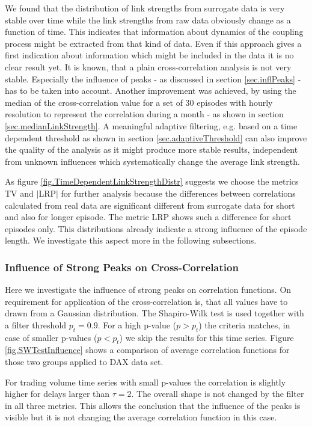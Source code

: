 \documentclass[a4paper,10pt]{scrbook}
\begin{document}
\label{ext.fig.TimeDependentLinkStrengthDistr} 


%
  
We found that the distribution of link strengths from surrogate data is very stable over time while the link strengths from raw data obviously change as a function of time. This indicates that information about dynamics of the coupling process might be extracted from that kind of data. Even if this approach gives a first indication about information which might be included in the data it is no clear result yet. It is known, that a plain cross-correlation analysis is not very stable. Especially the influence of peaks - as discussed in section \ref{sec.inflPeaks} - has to be taken into account. Another improvement was achieved, by using the median of the cross-correlation value for a set of 30 episodes with hourly resolution to represent the correlation during a month - as shown in section \ref{sec.medianLinkStrength}. A meaningful adaptive filtering, e.g. based on a time dependent threshold as shown in section \ref{sec.adaptiveThreshold} can also improve the quality of the analysis as it might produce more stable results, independent from unknown influences which systematically change the average link strength. 

As figure \ref{fig.TimeDependentLinkStrengthDistr} suggests we choose the metrics TV and $\vert$LRP$\vert$ for further analysis because the differences between correlations calculated from real data are significant different from surrogate data for short and also for longer episode. The metric LRP shows such a difference for short episodes only. This distributions already indicate a strong influence of the episode length. We investigate this aspect more in the following subsections.

\subsubsection{Influence of Strong Peaks on Cross-Correlation} 
Here we investigate the influence of strong peaks on correlation functions. On requirement for application of the cross-correlation is, that all values have to drawn from a Gaussian distribution. The Shapiro-Wilk test is used together with a filter threshold $p_t = 0.9$. For a high p-value ($p > p_t$) the criteria matches, in case of smaller p-values ($p < p_t$) we skip the results for this time series. Figure \ref{fig.SWTestInfluence} shows a comparison of average correlation functions for those two groups applied to DAX data set.
\label{ext.fig.SWTestInfluence} 

For trading volume time series with small p-values the correlation is slightly higher for delays larger than $\tau=2$. The overall shape is not changed by the filter in all three metrics. This allows the conclusion that the influence of the peaks is visible but it is not changing the average correlation function in this case. 
\end{document}
